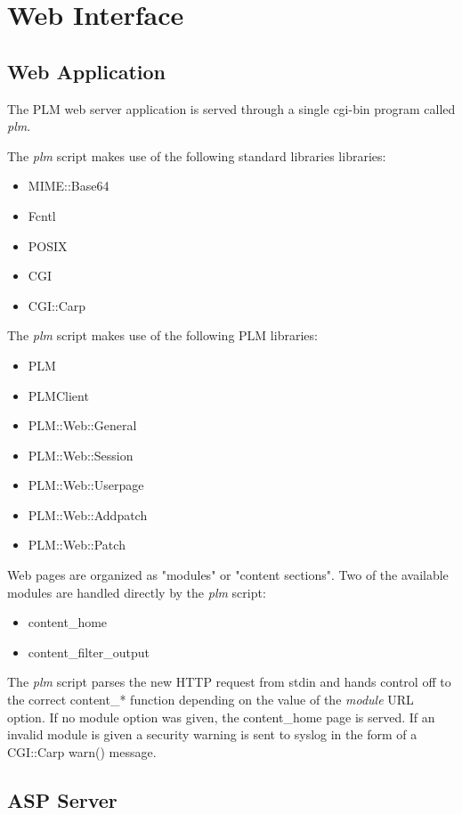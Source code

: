 \section{Web Interface}
\subsection{Web Application}
The PLM web server application is served through a single cgi-bin program called \emph{plm}.

The \emph{plm} script makes use of the following standard libraries libraries:
\begin{itemize}
\item MIME::Base64
\item Fcntl
\item POSIX
\item CGI
\item CGI::Carp
\end{itemize}

The \emph{plm} script makes use of the following PLM libraries:
\begin{itemize}
\item PLM
\item PLMClient
\item PLM::Web::General
\item PLM::Web::Session
\item PLM::Web::Userpage
\item PLM::Web::Addpatch
\item PLM::Web::Patch
\end{itemize}

Web pages are organized as "modules" or "content sections".  Two of the available modules
are handled directly by the \emph{plm} script:

\begin{itemize}
\item content\_home
\item content\_filter\_output
\end{itemize}

The \emph{plm} script parses the new HTTP request from stdin and hands control
off to the correct content\_* function depending on the value of the \emph{module}
URL option.  If no module option was given, the content\_home page is served.  If
an invalid module is given a security warning is sent to syslog in the form of a 
CGI::Carp warn() message.

\subsection{ASP Server}

